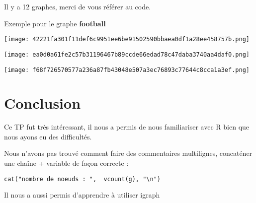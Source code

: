 \documentclass[12pt]{report}
\begin{document}
Il y a 12 graphes, merci de vous référer au code.

Exemple pour le graphe \textbf{football}

\begin{center} 

 \texttt{[image: 42221fa301f11def6c9951ee6be91502590bbaea0df1a28ee458757b.png]}


\end{center} \begin{center} 

 \texttt{[image: ea0d0a61fe2c57b31196467b89ccde66edad78c47daba3740aa4daf0.png]}


\end{center} \begin{center} 

 \texttt{[image: f68f726570577a236a87fb43048e507a3ec76893c77644c8cca1a3ef.png]}


\end{center}

\section{Conclusion}

\textbf{}

Ce TP fut très intéressant, il nous a permis de nous familiariser avec R
bien que nous ayons eu des difficultés.

Nous n'avons pas trouvé comment faire des commentaires multilignes,
concaténer une chaîne + variable de façon correcte :

\begin{verbatim}
cat("nombre de noeuds : ",  vcount(g), "\n")
\end{verbatim}

Il nous a aussi permis d'apprendre à utiliser igraph
\end{document}
